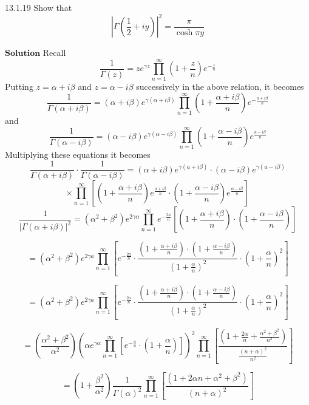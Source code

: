\documentclass{article}
\begin{document}
\begin{flushleft}
\begin{mybox}{13.1.19}
Show that 
$$\left|\Gamma(\frac{1}{2}+i y)\right|^{2}=\frac{\pi}{\cosh \pi y}$$
\end{mybox}


$\boxed{\textbf{Solution}}$ Recall 
$$
\frac{1}{\Gamma(z)}=z e^{\gamma z} \prod_{n=1}^{\infty}\left(1+\frac{z}{n}\right) e^{-\frac{z}{n}}
$$
Putting $z=\alpha+i \beta$ and $z=\alpha-i \beta$ successively in the above relation, it becomes
$$
\frac{1}{\Gamma(\alpha+i \beta)}=(\alpha+i \beta) e^{\gamma(\alpha+i \beta)} \prod_{n=1}^{\infty}\left(1+\frac{\alpha+i \beta}{n}\right) e^{-\frac{a+i \beta}{n}}
$$
and 
$$
\frac{1}{\Gamma(\alpha-i \beta)}=(\alpha-i \beta) e^{\gamma(\alpha-i \beta)} \prod_{n=1}^{\infty}\left(1+\frac{\alpha-i \beta}{n}\right) e^{\frac{a-i \beta}{n}}
$$
Multiplying these equations it becomes
$$
\frac{1}{\Gamma(\alpha+i \beta)} \cdot \frac{1}{\Gamma(\alpha-i \beta)}=(\alpha+i \beta) e^{\gamma(a+i \beta)} \cdot(\alpha-i \beta) e^{\gamma(a-i \beta)}$$
$$\times \prod_{n=1}^{\infty}\left[\left(1+\frac{\alpha+i \beta}{n}\right) e^{\frac{a+i \beta}{n}} \cdot\left(1+\frac{\alpha-i \beta}{n}\right) e^{\frac{\alpha-i \beta}{n}}\right]
$$
$$
\frac{1}{|\Gamma(\alpha+i \beta)|^{2}}=\left(\alpha^{2}+\beta^{2}\right) e^{2\gamma \alpha} \prod_{n=1}^{\infty} e^{-\frac{2 a}{n}}\left[\left(1+\frac{\alpha+i \beta}{n}\right) \cdot\left(1+\frac{\alpha-i \beta}{n}\right)\right]
$$


$$
=\left(\alpha^{2}+\beta^{2}\right) e^{2 \gamma a} \prod_{n=1}^{\infty}\left[e^{-\frac{2 a}{n}} \cdot \frac{\left(1+\frac{\alpha+i \beta}{n}\right) \cdot\left(1+\frac{\alpha-i \beta}{n}\right)}{\left(1+\frac{\alpha}{n}\right)^{2}} \cdot\left(1+\frac{\alpha}{n}\right)^{2}\right]
$$

$$
=\left(\alpha^{2}+\beta^{2}\right) e^{2 \gamma a} \prod_{n=1}^{\infty}\left[e^{-\frac{2 a}{n}} \cdot \frac{\left(1+\frac{\alpha+i \beta}{n}\right) \cdot\left(1+\frac{\alpha-i \beta}{n}\right)}{\left(1+\frac{\alpha}{n}\right)^{2}} \cdot\left(1+\frac{\alpha}{n}\right)^{2}\right]
$$

$$
=\left(\frac{\alpha^{2}+\beta^{2}}{\alpha^{2}}\right)\left(\alpha e^{\gamma \alpha} \prod_{n=1}^{\infty}\left[e^{-\frac{a}{n}} \cdot\left(1+\frac{\alpha}{n}\right)\right]\right)^{2} \prod_{n=1}^{\infty}\left[\frac{\left(1+\frac{2 \alpha}{n}+\frac{\alpha^{2}+\beta^{2}}{n^{2}}\right)}{\frac{(n+\alpha)^{2}}{n^{2}}}\right]
$$


$$
=\left(1+\frac{\beta^{2}}{\alpha^{2}}\right) \frac{1}{\Gamma(\alpha)^{2}} \prod_{n=1}^{\infty}\left[\frac{\left(1+2 \alpha n+\alpha^{2}+\beta^{2}\right)}{(n+\alpha)^{2}}\right]
$$


\end{flushleft}
\end{document}
